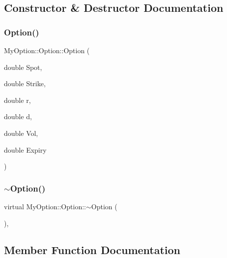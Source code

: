 \subsection{Constructor \& Destructor Documentation}
\hypertarget{classMyOption_1_1Option_af0a5ceb0b3d55be89aeb858a9628cac2}{}\label{classMyOption_1_1Option_af0a5ceb0b3d55be89aeb858a9628cac2} 
\subsubsection{\texorpdfstring{Option()}{Option()}}
{\footnotesize\ttfamily My\+Option\+::\+Option\+::\+Option (\begin{DoxyParamCaption}\item[{double}]{Spot,  }\item[{double}]{Strike,  }\item[{double}]{r,  }\item[{double}]{d,  }\item[{double}]{Vol,  }\item[{double}]{Expiry }\end{DoxyParamCaption})}

\hypertarget{classMyOption_1_1Option_a628fa8400b2ff4d8dbb71fb17b8b9d07}{}\label{classMyOption_1_1Option_a628fa8400b2ff4d8dbb71fb17b8b9d07} 
\subsubsection{\texorpdfstring{$\sim$\+Option()}{~Option()}}
{\footnotesize\ttfamily virtual My\+Option\+::\+Option\+::$\sim$\+Option (\begin{DoxyParamCaption}{ }\end{DoxyParamCaption})\hspace{0.3cm}{\ttfamily [inline]}, {\ttfamily [virtual]}}



\subsection{Member Function Documentation}
\hypertarget{classMyOption_1_1Option_a05144da1201808f0d6c158e3e45efc61}{}\label{classMyOption_1_1Option_a05144da1201808f0d6c158e3e45efc61} 
